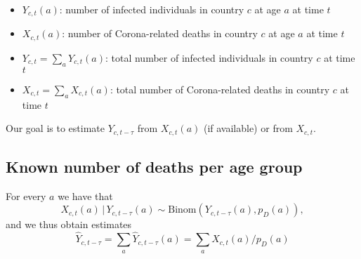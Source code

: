 \documentclass[a4paper]{article}
\renewcommand\P{\mathbb{P}}
\newcommand{\given}{\, \vert \,}
\begin{document}
{\begin{itemize}
\item $Y_{c,t}(a)$: number of infected individuals in country $c$ at age $a$ at time $t$
\item $X_{c,t}(a)$: number of Corona-related deaths in country $c$ at age $a$ at time $t$
\item $Y_{c,t} = \sum_a Y_{c,t}(a)$: total number of infected individuals in country $c$ at time $t$
\item $X_{c,t} = \sum_a X_{c,t}(a)$: total number of Corona-related deaths in country $c$ at time $t$
\end{itemize}
%
Our goal is to estimate $Y_{c,t-\tau}$ from $X_{c,t}(a)$ (if available) or from $X_{c,t}$. 

\subsection{Known number of deaths per age group}
%
For every $a$ we have that 
$$X_{c,t}(a) \given Y_{c,t-\tau}(a) \sim \text{Binom}(Y_{c,t-\tau}(a), p_D(a)),$$
and we thus obtain estimates 
$$\hat{Y}_{c,t-\tau} = \sum_a \hat{Y}_{c,t-\tau}(a) =\sum_a  X_{c,t}(a) / p_D(a)$$

}
\end{document}
